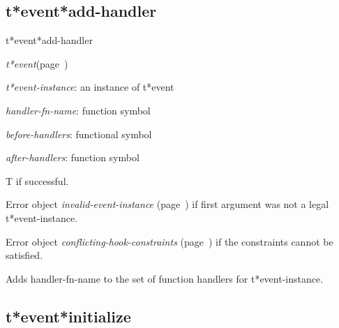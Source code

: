 \subsection{t*event*add-handler}
\label{t*event*add-handler}

\begin{description}
\item [Name:]  t*event*add-handler

\item [Class:] {\sl t*event}\hfill(page~\pageref{t*event})

\item [Parameters:]
\item {\sl t*event-instance}:  an instance of t*event


\item {\sl handler-fn-name}:  function symbol

\item {\sl before-handlers}:  functional symbol

\item {\sl after-handlers}:  function symbol


\item [Return-value:]
T if successful.

Error object {\sl invalid-event-instance} (page~\pageref{invalid-event-instance}) if first
argument was not a legal t*event-instance.

Error object {\sl conflicting-hook-constraints} (page~\pageref{conflicting-hook-constraints}) if the 
constraints cannot be satisfied.

\item [Description:]

Adds handler-fn-name to the set of function handlers for
t*event-instance.

\item [Public:]



\end{description}
\horizontalline

\subsection{t*event*initialize}
\label{t*event*initialize}

